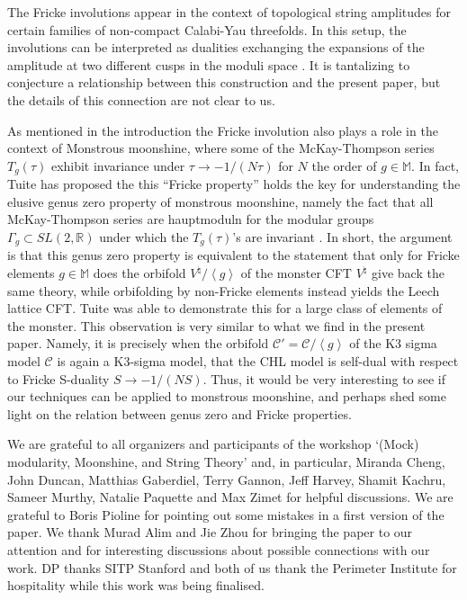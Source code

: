\documentclass[a4paper,11pt]{article}
\numberwithin{equation}{section}
\begin{document}
The Fricke involutions appear in the context of topological string amplitudes for certain families of non-compact Calabi-Yau threefolds. In this setup, the involutions can be interpreted as dualities exchanging the expansions of the amplitude at two different cusps in the moduli space \cite{Alim2014}. It is tantalizing to conjecture a relationship between this construction and the present paper, but the details of this connection are not clear to us.


As mentioned in the introduction the Fricke involution also plays a role in the context of Monstrous moonshine, where some of the McKay-Thompson series $T_g(\tau)$ exhibit invariance under $\tau \to -1/(N\tau)$ for $N$ the order of $g\in \mathbb{M}$. In fact, Tuite has proposed the this ``Fricke property'' holds the key for understanding the elusive genus zero property of monstrous moonshine, namely the fact that all McKay-Thompson series are hauptmoduln for the modular groups $\Gamma_g\subset SL(2,\mathbb{R})$ under which the $T_g(\tau)$'s are invariant \cite{Tuite1995}. In short, the argument is that this genus zero property is equivalent to the statement that only for Fricke elements $g\in \mathbb{M}$ does the orbifold $V^{\natural}/\left<g\right>$  of the monster CFT $V^{\natural}$  give back the same theory, while orbifolding by non-Fricke elements instead yields the Leech lattice CFT. Tuite was able to demonstrate this for a large class of elements of the monster. This observation  is very similar to what we find in the present paper. Namely, it is precisely when the orbifold $\mathcal{C}'=\mathcal{C}/\left<g\right>$ of the K3 sigma model $\mathcal{C}$ is again a K3-sigma model, that the CHL model is self-dual with respect to Fricke S-duality $S\to -1/(NS)$. Thus, it would be very interesting to see if our techniques can be applied to monstrous moonshine, and perhaps shed some light on the relation between genus zero and Fricke properties. 

\acknowledgments

We are grateful to all organizers and participants of the workshop `(Mock) modularity, Moonshine, and String Theory' and, in particular, Miranda Cheng, John Duncan, Matthias Gaberdiel, Terry Gannon, Jeff Harvey, Shamit Kachru, Sameer Murthy, Natalie Paquette and Max Zimet for helpful discussions. We are grateful to Boris Pioline for pointing out some mistakes in a first version of the paper. We thank Murad Alim and Jie Zhou for bringing the paper \cite{Alim2014} to our attention and for interesting discussions about possible connections with our work.
DP thanks SITP Stanford and both of us thank the Perimeter Institute for hospitality while this work was being finalised.
\end{document}
